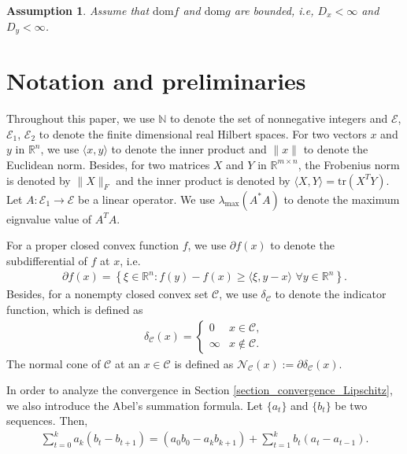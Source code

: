 \documentclass{article}
\numberwithin{equation}{section}
\newtheorem{assumption}{Assumption}[section]
\begin{document}
\begin{assumption} \label{Assumption 2}
    Assume that $\mathrm{dom} f$ and $\mathrm{dom} g$ are bounded, i.e, $D_x<\infty$ and $D_y < \infty$. 
\end{assumption}

\section{Notation and preliminaries}
Throughout this paper, we use $\mathbb{N}$ to denote the set of nonnegative integers and $\mathcal{E}$, $\mathcal{E}_1$, $\mathcal{E}_2$ to denote the 
finite dimensional real Hilbert spaces. For two vectors $x$ and $y$ in $\mathbb{R}^n$, we use $\langle x,y\rangle$
to denote the inner product and $\|x\rVert$ to denote the Euclidean norm. Besides, for two matrices 
$X$ and $Y$ in $\mathbb{R}^{m\times n}$, the Frobenius norm is denoted by $\|X\rVert_F$ and 
the inner product is denoted by $\langle X,Y \rangle =\mathrm{tr}\left(X^TY\right)$.
Let $A: \mathcal{E}_1\rightarrow \mathcal{E}$ be a linear operator. We use $\lambda_{\max}(A^*A)$ to denote the maximum eignvalue value of $A^TA  $.

For a proper closed convex function $f$, we use $\partial f(x)$ to denote the subdifferential of $f$ at $x$, 
i.e.
\begin{align}
    \partial f(x) = \left\{\xi \in \mathbb{R}^n: f(y)- f(x) \geq\langle \xi, y-x \rangle \hspace{4pt} \forall y \in \mathbb{R}^n\right\}. 
    \nonumber
\end{align}
Besides, for a nonempty closed convex set $\mathcal{C}$, we use $\delta_{\mathcal{C}}$ to denote the indicator function, which
is defined as 
\begin{align}
    \delta_{\mathcal{C}}(x) = \left\{ 
        \begin{array}{cc}
            0  & x\in \mathcal{C},  \nonumber \\
            \infty & x \notin \mathcal{C}.  \nonumber
        \end{array}
     \right.  \nonumber
\end{align}
The normal cone of $\mathcal{C}$ at an $x\in\mathcal{C}$ is 
defined as $\mathcal{N}_{\mathcal{C}}(x):=\partial\delta_{\mathcal{C}}(x)$. 

In order to analyze the convergence in Section \ref{section_convergence_Lipschitz}, we also introduce the Abel's summation formula. Let
$\{a_t\}$ and $\{b_t\}$ be two sequences. Then, 
\begin{align}
    \sum\limits_{t=0}^k a_k(b_t - b_{t+1}) = (a_0b_0 - a_{k}b_{k+1})+ \sum\limits_{t=1}^{k} b_{t}(a_{t}-a_{t-1}). 
    \label{Abel formula}
\end{align}
\end{document}
